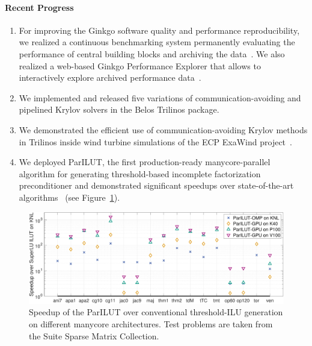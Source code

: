 \paragraph{Recent Progress}
\begin{enumerate}
\item 
For improving the Ginkgo software quality and performance reproducibility, we 
realized a continuous benchmarking system permanently evaluating the 
performance of central building blocks and archiving the data~\cite{pasc_anzt}. 
We 
also realized a web-based Ginkgo Performance Explorer that allows to 
interactively explore archived performance 
data~\cite{gpewebpage}.
\item
We implemented and released five variations of communication-avoiding
and pipelined Krylov solvers in the Belos Trilinos package.
\item
We demonstrated the efficient use of communication-avoiding Krylov methods in Trilinos
inside wind turbine simulations of the ECP ExaWind project~\cite{Yamazaki-lowsynch}.
\item 
We deployed ParILUT, the first production-ready manycore-parallel algorithm for 
generating threshold-based incomplete factorization preconditioner and 
demonstrated significant speedups over state-of-the-art 
algorithms~\cite{ipdps_anzt} (see Figure~\ref{fig:ParILUTperf}).
\end{enumerate}

\begin{figure}[htb]
	\centering
	\includegraphics[width=6in]{projects/2.3.3-MathLibs/2.3.3.13-CLOVER/parilutspeedup}
	\caption{\label{fig:ParILUTperf}Speedup of the ParILUT over conventional 
	threshold-ILU generation on different manycore architectures. Test problems 
	are taken from the Suite Sparse Matrix Collection.}
\end{figure}


